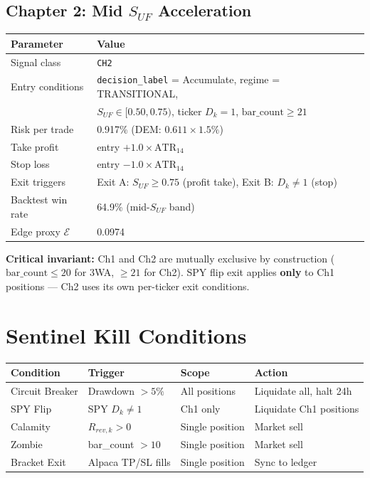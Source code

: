 \documentclass[11pt, a4paper]{article}
\begin{document}
\subsection{Chapter 2: Mid $S_{UF}$ Acceleration}

\begin{center}
\begin{tabular}{@{}ll@{}}
\toprule
\textbf{Parameter} & \textbf{Value} \\
\midrule
Signal class & \texttt{CH2} \\
Entry conditions & \texttt{decision\_label} = Accumulate, regime = TRANSITIONAL, \\
                 & $S_{UF} \in [0.50, 0.75)$, ticker $D_k = 1$, $\text{bar\_count} \geq 21$ \\
Risk per trade & 0.917\% (DEM: $0.611 \times 1.5\%$) \\
Take profit & entry $+ 1.0 \times \text{ATR}_{14}$ \\
Stop loss & entry $- 1.0 \times \text{ATR}_{14}$ \\
Exit triggers & Exit A: $S_{UF} \geq 0.75$ (profit take), Exit B: $D_k \neq 1$ (stop) \\
Backtest win rate & 64.9\% (mid-$S_{UF}$ band) \\
Edge proxy $\mathcal{E}$ & 0.0974 \\
\bottomrule
\end{tabular}
\end{center}

\textbf{Critical invariant:} Ch1 and Ch2 are mutually exclusive by construction
($\text{bar\_count} \leq 20$ for 3WA, $\geq 21$ for Ch2). SPY flip exit applies
\textbf{only} to Ch1 positions --- Ch2 uses its own per-ticker exit conditions.

\section{Sentinel Kill Conditions}

\begin{center}
\begin{tabular}{@{}llll@{}}
\toprule
\textbf{Condition} & \textbf{Trigger} & \textbf{Scope} & \textbf{Action} \\
\midrule
Circuit Breaker & Drawdown $> 5\%$ & All positions & Liquidate all, halt 24h \\
SPY Flip & SPY $D_k \neq 1$ & Ch1 only & Liquidate Ch1 positions \\
Calamity & $R_{rev,k} > 0$ & Single position & Market sell \\
Zombie & bar\_count $> 10$ & Single position & Market sell \\
Bracket Exit & Alpaca TP/SL fills & Single position & Sync to ledger \\
\bottomrule
\end{tabular}
\end{center}
\end{document}
